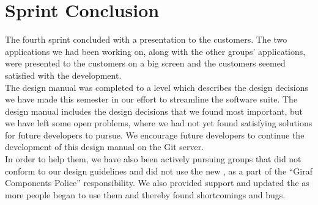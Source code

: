 
\chapter{Sprint Conclusion}
\label{cha:conclusion_sprint_4}

The fourth sprint concluded with a presentation to the customers. The two applications we had been working on, along with the other groups' applications, were presented to the customers on a big screen and the customers seemed satisfied with the development. \\

The design manual was completed to a level which describes the design decisions we have made this semester in our effort to streamline the \giraf software suite. The design manual includes the design decisions that we found most important, but we have left some open problems, where we had not yet found satisfying solutions for future \giraf developers to pursue. We encourage future \giraf developers to continue the development of this design manual on the \giraf Git server. \\

In order to help them, we have also been actively pursuing groups that did not conform to our design guidelines and did not use the new \gc, as a part of the ``Giraf Components Police'' responsibility. We also provided support and updated the \gc as more people began to use them and thereby found shortcomings and bugs. 